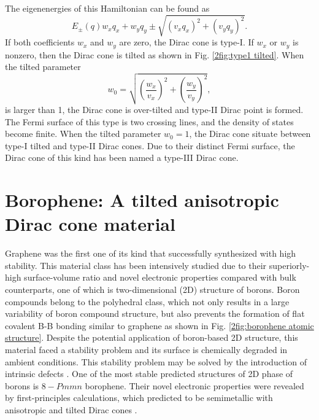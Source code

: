     The eigenenergies of this Hamiltonian can be found as
    \begin{equation} \label{2eq:eigenenergies}
        E_{\pm}(q) w_{x}q_x + w_{y}q_y \pm \sqrt{(v_x q_x)^2 + (v_y q_y)^2}.
    \end{equation}
    If both coefficients $w_{x}$ and $w_{y}$ are zero, the Dirac cone is type-I.
    If $w_{x}$ or $w_{y}$ is nonzero, then the Dirac cone is tilted as shown in Fig. \ref{2fig:type1 tilted}.
    When the tilted parameter
    \begin{equation} \label{2eq:tilted parameter}
        w_0 = \sqrt{\left(\frac{w_x}{v_x}\right)^2 + \left(\frac{w_y}{v_y}\right)^2},
    \end{equation}
    is larger than 1, the Dirac cone is over-tilted and type-II Dirac point is formed.
    The Fermi surface of this type is two crossing lines, and the density of states become finite.
    When the tilted parameter $w_0 = 1$, the Dirac cone situate between type-I tilted and type-II Dirac cones.
    Due to their distinct Fermi surface, the Dirac cone of this kind has been named a type-III Dirac cone.

\section{Borophene: A tilted anisotropic Dirac cone material}
    Graphene was the first one of its kind that successfully synthesized with high stability.
    This material class has been intensively studied due to their superiorly-high surface-volume ratio and novel electronic properties compared with bulk counterparts, one of which is two-dimensional (2D) structure of borons.
    Boron compounds belong to the polyhedral class, which not only results in a large variability of boron compound structure, but also prevents the formation of flat covalent B-B bonding similar to graphene as shown in Fig. \ref{2fig:borophene atomic structure}.
    Despite the potential application of boron-based 2D structure, this material faced a stability problem and its surface is chemically degraded in ambient conditions.
    This stability problem may be solved by the introduction of intrinsic defects \cite{Liu2013}.
    One of the most stable predicted structures of 2D phase of borons is $8-Pmmn$ borophene.
    Their novel electronic properties were revealed by first-principles calculations, which predicted to be semimetallic with anisotropic and tilted Dirac cones \cite{Lopez-Bezanilla2016,Zhou2014}.
    
